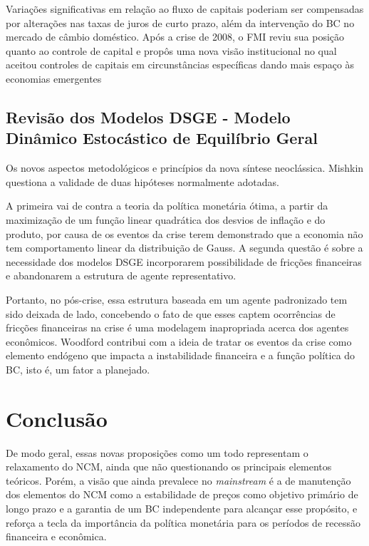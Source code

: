 \documentclass[report]{uftex}
\begin{document}
Variações significativas em relação ao fluxo de capitais poderiam ser compensadas por alterações nas taxas de juros de curto prazo, além da intervenção do BC no mercado de câmbio doméstico. Após a crise de 2008, o FMI reviu sua posição quanto ao controle de capital e propôs uma nova visão institucional no qual aceitou controles de capitais em circunstâncias específicas dando mais espaço às economias emergentes

\subsection{Revisão dos Modelos DSGE - Modelo Dinâmico Estocástico de Equilíbrio Geral}

Os novos aspectos metodológicos e princípios da nova síntese neoclássica. Mishkin questiona a validade de duas hipóteses normalmente adotadas.

A primeira vai de contra a teoria da política monetária ótima, a partir da maximização de um função linear quadrática dos desvios de inflação e do produto, por causa de os eventos da crise terem demonstrado que a economia não tem comportamento linear da distribuição de Gauss. A segunda questão é sobre a necessidade dos modelos DSGE incorporarem possibilidade de fricções financeiras e abandonarem a estrutura de agente representativo.

Portanto, no pós-crise, essa estrutura baseada em um agente padronizado tem sido deixada de lado, concebendo o fato de que esses captem ocorrências de fricções financeiras na crise é uma modelagem inapropriada acerca dos agentes econômicos. Woodford contribui com a ideia de tratar os eventos da crise como elemento endógeno que impacta a instabilidade financeira e a função política do BC, isto é, um fator a planejado.

\section{Conclusão}

De modo geral, essas novas proposições como um todo representam o relaxamento do NCM, ainda que não questionando os principais elementos teóricos. Porém, a visão que ainda prevalece no \textit{mainstream} é a de manutenção dos elementos do NCM como a estabilidade de preços como objetivo primário de longo prazo e a garantia de um BC independente para alcançar esse propósito, e reforça a tecla da importância da política monetária para os períodos de recessão financeira e econômica.
\end{document}
